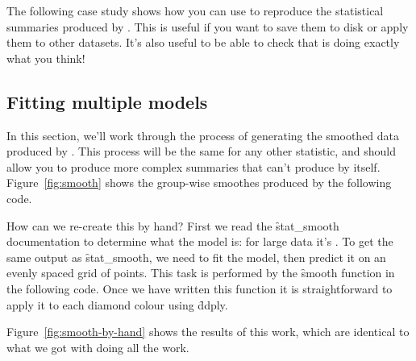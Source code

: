The following case study shows how you can use  to reproduce the statistical summaries produced by \ggplot.  This is useful if you want to save them to disk or apply them to other datasets.  It's also useful to be able to check that \ggplot is doing exactly what you think!

\subsection{Fitting multiple models}
\label{sub:multiple_models}

In this section, we'll work through the process of generating the smoothed data produced by .  This process will be the same for any other statistic, and should allow you to produce more complex summaries that \ggplot can't produce by itself.  Figure~\ref{fig:smooth} shows the group-wise smoothes produced by the following code.  

% 


How can we re-create this by hand?  First we read the \f{stat_smooth} documentation to determine what the model is: for large data it's .  To get the same output as \f{stat_smooth}, we need to fit the model, then predict it on an evenly spaced grid of points. This task is performed by the \f{smooth} function in the following code.  Once we have written this function it is straightforward to apply it to each diamond colour  using \f{ddply}. 

Figure~\ref{fig:smooth-by-hand} shows the results of this work, which are identical to what we got with \ggplot doing all the work.

% 
%   


